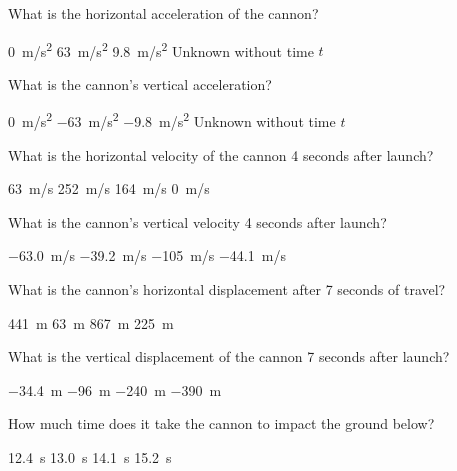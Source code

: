 \documentclass[../main-physics-workbook.tex]{subfiles}
\begin{document}
\begin{questions}
\question
What is the horizontal acceleration of the cannon?

\begin{choices}
    \correctchoice \SI{0}{m/s^2}
    \choice \SI{63}{m/s^2}
    \choice \SI{9.8}{m/s^2}
    \choice Unknown without time $t$
\end{choices}

\question
What is the cannon's vertical acceleration?

\begin{choices}
    \choice \SI{0}{m/s^2}
    \choice \SI{-63}{m/s^2}
    \correctchoice \SI{-9.8}{m/s^2}
    \choice Unknown without time $t$
\end{choices}

\clearpage
\question
What is the horizontal velocity of the cannon 4 seconds after launch?

\begin{choices}
    \correctchoice \SI{63}{m/s}
    \choice \SI{252}{m/s}
    \choice \SI{164}{m/s}
    \choice \SI{0}{m/s}
\end{choices}

\question 
What is the cannon's vertical velocity 4 seconds after launch?

\begin{choices}
    \choice \SI{-63.0}{m/s}
    \correctchoice \SI{-39.2}{m/s}
    \choice \SI{-105}{m/s}
    \choice \SI{-44.1}{m/s}
\end{choices}

\question
What is the cannon's horizontal displacement after 7 seconds of travel?

\begin{choices}
    \correctchoice \SI{441}{m}
    \choice \SI{63}{m}
    \choice \SI{867}{m}
    \choice \SI{225}{m}
\end{choices}

\question
What is the vertical displacement of the cannon 7 seconds after launch?

\begin{choices}
    \choice \SI{-34.4}{m}
    \choice \SI{-96}{m}
    \correctchoice \SI{-240}{m}
    \choice \SI{-390}{m}
\end{choices}


\question
How much time does it take the cannon to impact the ground below?

\begin{choices}
    \correctchoice \SI{12.4}{s}
    \choice \SI{13.0}{s}
    \choice \SI{14.1}{s}
    \choice \SI{15.2}{s}
\end{choices}


\end{questions}
\end{document}
